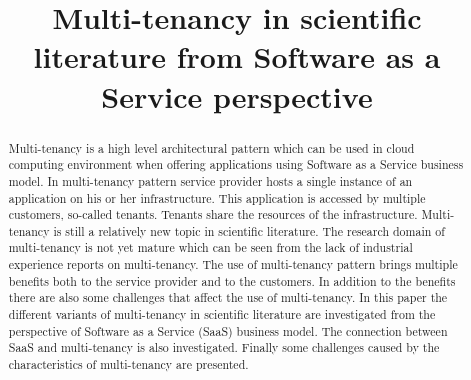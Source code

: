 \documentclass[conference]{sasmoota2017}
\begin{document}
%
\title{Multi-tenancy in scientific literature from Software as a Service perspective}


\author{
}


\maketitle

\begin{abstract}

Multi-tenancy is a high level architectural pattern which can be used in cloud computing environment when offering applications using Software as a Service business model. In multi-tenancy pattern service provider hosts a single instance of an application on his or her infrastructure. This application is accessed by multiple customers, so-called tenants. Tenants share the resources of the infrastructure. Multi-tenancy is still a relatively new topic in scientific literature. The research domain of multi-tenancy is not yet mature which can be seen from the lack of industrial experience reports on multi-tenancy. The use of multi-tenancy pattern brings multiple benefits both to the service provider and to the customers. In addition to the benefits there are also some challenges that affect the use of multi-tenancy. In this paper the different variants of multi-tenancy in scientific literature are investigated from the perspective of Software as a Service (SaaS) business model. The connection between SaaS and multi-tenancy is also investigated. Finally some challenges caused by the characteristics of multi-tenancy are presented.  

\end{abstract}
\end{document}

